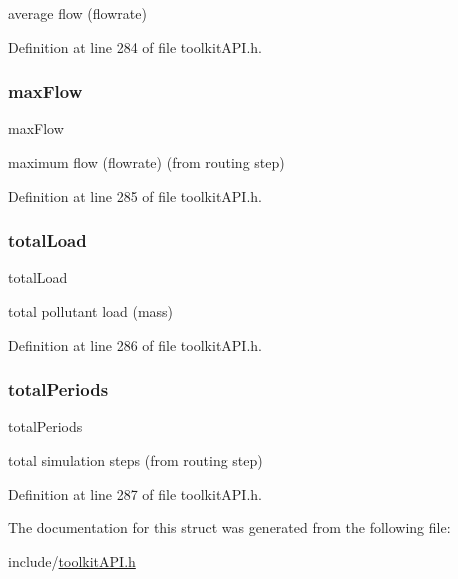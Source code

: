 average flow (flowrate) 

Definition at line 284 of file toolkit\+A\+P\+I.\+h.

\mbox{\label{struct_s_m___outfall_stats_a4d84bca5454f3903c44fe865e44674f5}} 
\subsubsection{\texorpdfstring{max\+Flow}{maxFlow}}
{\footnotesize\ttfamily max\+Flow}

maximum flow (flowrate) (from routing step) 

Definition at line 285 of file toolkit\+A\+P\+I.\+h.

\mbox{\label{struct_s_m___outfall_stats_a07bf14d41a8a678b2cad797d53f84fa8}} 
\subsubsection{\texorpdfstring{total\+Load}{totalLoad}}
{\footnotesize\ttfamily total\+Load}

total pollutant load (mass) 

Definition at line 286 of file toolkit\+A\+P\+I.\+h.

\mbox{\label{struct_s_m___outfall_stats_a60fffeca33e0487e4b7cac3898b2cf05}} 
\subsubsection{\texorpdfstring{total\+Periods}{totalPeriods}}
{\footnotesize\ttfamily total\+Periods}

total simulation steps (from routing step) 

Definition at line 287 of file toolkit\+A\+P\+I.\+h.



The documentation for this struct was generated from the following file\+:\begin{DoxyCompactItemize}
\item 
include/\hyperlink{toolkit_a_p_i_8h}{toolkit\+A\+P\+I.\+h}\end{DoxyCompactItemize}

